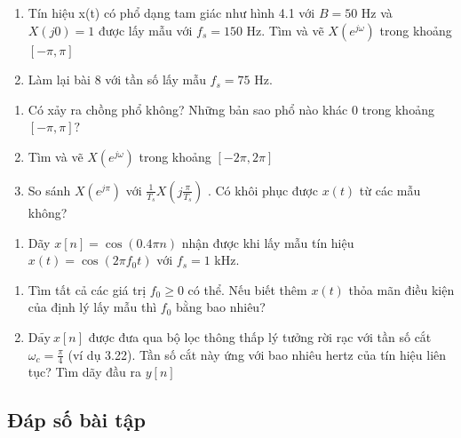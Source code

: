 \documentclass[
  10
]{article}
\providecommand{\tightlist}{%
  \setlength{\itemsep}{0pt}\setlength{\parskip}{0pt}}
\begin{document}
\begin{enumerate}
\def\labelenumi{\arabic{enumi}.}
\setcounter{enumi}{7}
\item
  Tín hiệu x(t) có phổ dạng tam giác như hình 4.1 với \(B = 5 0\) Hz và
  \(X ( j 0 ) = 1\) được lấy mẫu với \(f _ { s } = 1 5 0\) Hz. Tìm và vẽ
  \(X ( e ^ { j \omega } )\) trong khoảng \([ - \pi , \pi ]\)
\item
  Làm lại bài 8 với tần số lấy mẫu \(f _ { s } = 7 5\) Hz.
\end{enumerate}

\begin{enumerate}
\def\labelenumi{\alph{enumi}.}
\item
  Có xảy ra chồng phổ không? Những bản sao phổ nào khác 0 trong khoảng
  \([ - \pi , \pi ] ?\)
\item
  Tìm và vẽ \(X ( e ^ { j \omega } )\) trong khoảng
  \([ - 2 \pi , 2 \pi ]\)
\item
  So sánh \(X ( e ^ { j \pi } )\) với
  \(\textstyle { \frac { 1 } { T _ { s } } } X \left( j { \frac { \pi } { T _ { s } } } \right)\)
  . Có khôi phục được \(x ( t )\) từ các mẫu không?
\end{enumerate}

\begin{enumerate}
\def\labelenumi{\arabic{enumi}.}
\setcounter{enumi}{9}
\tightlist
\item
  Dãy \(x [ n ] = \cos ( 0 . 4 \pi n )\) nhận được khi lấy mẫu tín hiệu
  \(x ( t ) = \cos ( 2 \pi f _ { 0 } t )\) với \(f _ { s } = 1\) kHz.
\end{enumerate}

\begin{enumerate}
\def\labelenumi{\alph{enumi}.}
\item
  Tìm tất cả các giá trị \(f _ { 0 } \geq 0\) có thể. Nếu biết thêm
  \(x ( t )\) thỏa mãn điều kiện của định lý lấy mẫu thì \(f _ { 0 }\)
  bằng bao nhiêu?
\item
  \(\mathrm { D } \tilde { \mathrm { a y } } \ x [ n ]\) được đưa qua bộ
  lọc thông thấp lý tưởng rời rạc với tần số cắt
  \(\omega _ { c } = \frac { \pi } { 4 }\) (ví dụ 3.22). Tần số cắt này
  ứng với bao nhiêu hertz của tín hiệu liên tục? Tìm dãy đầu ra
  \(y [ n ]\)
\end{enumerate}

\subsection{Đáp số bài tập}\label{ux111uxe1p-sux1ed1-buxe0i-tux1eadp-2}
\end{document}
